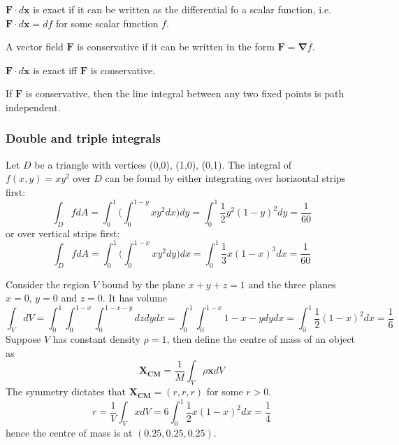 \documentclass[a4paper]{article}
\begin{document}
\begin{defi}
$\mathbf{F}\cdot d\mathbf{x}$ is exact if it can be written as the differential fo a scalar function, i.e. $\mathbf{F}\cdot d\mathbf{x}=df$ for some scalar function $f$.
\end{defi}
\begin{defi}
A vector field $\mathbf{F}$ is conservative if it can be written in the form $\mathbf{F}=\boldsymbol{\nabla}f$.
\end{defi}
\begin{prop}
$\mathbf{F}\cdot d\mathbf{x}$ is exact iff $\mathbf{F}$ is conservative.
\end{prop}
\begin{cor}
If $\mathbf{F}$ is conservative, then the line integral between any two fixed points is path independent.
\end{cor}
\subsubsection*{Double and triple integrals}
\begin{eg}
Let $D$ be a triangle with vertices (0,0), (1,0), (0,1). The integral of $f(x,y)=xy^2$ over $D$ can be found by either integrating over horizontal strips first:
$$\int_DfdA=\int_0^1\bigg(\int_0^{1-y}xy^2dx\bigg)dy=\int_0^1\frac{1}{2}y^2(1-y)^2dy=\frac{1}{60}$$
or over vertical strips first:
$$\int_DfdA=\int_0^1\bigg(\int_0^{1-x}xy^2dy\bigg)dx=\int_0^1\frac{1}{3}x(1-x)^3dx=\frac{1}{60}$$
\end{eg}
\begin{eg}
Consider the region $V$ bound by the plane $x+y+z=1$ and the three planes $x=0$, $y=0$ and $z=0$. It has volume
$$\int_VdV=\int_0^1\int_0^{1-x}\int_0^{1-x-y}dzdydx=\int_0^1\int_0^{1-x}1-x-ydydx=\int_0^1\frac{1}{2}(1-x)^2dx=\frac{1}{6}$$
Suppose $V$ has constant density $\rho=1$, then define the centre of mass of an object as
$$\mathbf{X_{CM}}=\frac{1}{M}\int_V\rho\mathbf{x}dV$$
The symmetry dictates that $\mathbf{X_{CM}}=(r,r,r)$ for some $r>0$.
$$r=\frac{1}{V}\int_VxdV=6\int_0^1\frac{1}{2}x(1-x)^2dx=\frac{1}{4}$$
hence the centre of mass is at $(0.25,0.25,0.25)$.
\end{eg}
\end{document}

